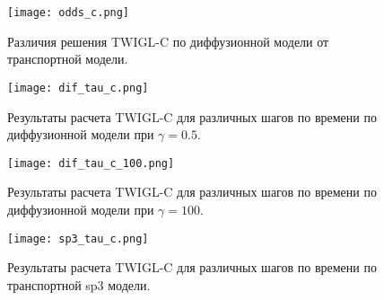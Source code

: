 \documentclass[a4paper,12pt]{article}
\begin{document}
\begin{figure}[htp]
\begin{center}
	\texttt{[image: odds\_c.png]}\\
	\caption{\label{image:canonsummary} Различия решения TWIGL-C по диффузионной модели от транспортной модели.}
	\label{ris:odds_c}
\end{center}
\end{figure}

\begin{figure}[htp]
\begin{center}
	\texttt{[image: dif\_tau\_c.png]}\\
	\caption{\label{image:canonsummary}Результаты расчета TWIGL-C для различных шагов по времени по диффузионной модели при $\gamma=0.5$.}
	\label{ris:dif_tau_c_0.5}
\end{center}
\end{figure}

\begin{figure}[htp]
\begin{center}
	\texttt{[image: dif\_tau\_c\_100.png]}\\
	\caption{\label{image:canonsummary}Результаты расчета TWIGL-C для различных шагов по времени по диффузионной модели при $\gamma=100$.}
	\label{ris:dif_tau_c_100}
\end{center}
\end{figure}

\begin{figure}[htp]
\begin{center}
	\texttt{[image: sp3\_tau\_c.png]}\\
	\caption{\label{image:canonsummary}Результаты расчета TWIGL-C для различных шагов по времени по транспортной sp3 модели.}
	\label{ris:sp3_tau_c}
\end{center}
\end{figure}

%
%
\end{document}
